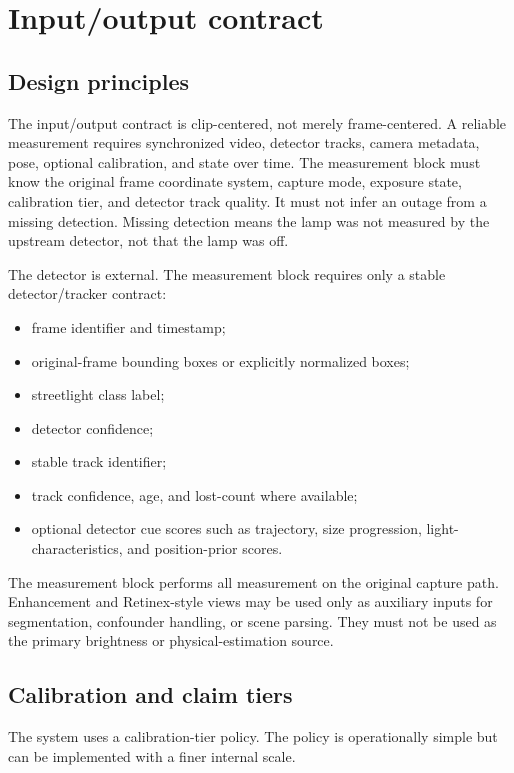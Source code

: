 \documentclass[11pt]{article}
\begin{document}
\section{Input/output contract}

\subsection{Design principles}

The input/output contract is clip-centered, not merely frame-centered. A reliable measurement requires synchronized video, detector tracks, camera metadata, pose, optional calibration, and state over time. The measurement block must know the original frame coordinate system, capture mode, exposure state, calibration tier, and detector track quality. It must not infer an outage from a missing detection. Missing detection means the lamp was not measured by the upstream detector, not that the lamp was off.

The detector is external. The measurement block requires only a stable detector/tracker contract:
\begin{itemize}
  \item frame identifier and timestamp;
  \item original-frame bounding boxes or explicitly normalized boxes;
  \item streetlight class label;
  \item detector confidence;
  \item stable track identifier;
  \item track confidence, age, and lost-count where available;
  \item optional detector cue scores such as trajectory, size progression, light-characteristics, and position-prior scores.
\end{itemize}

The measurement block performs all measurement on the original capture path. Enhancement and Retinex-style views may be used only as auxiliary inputs for segmentation, confounder handling, or scene parsing. They must not be used as the primary brightness or physical-estimation source.

\subsection{Calibration and claim tiers}

The system uses a calibration-tier policy. The policy is operationally simple but can be implemented with a finer internal scale.
\end{document}
